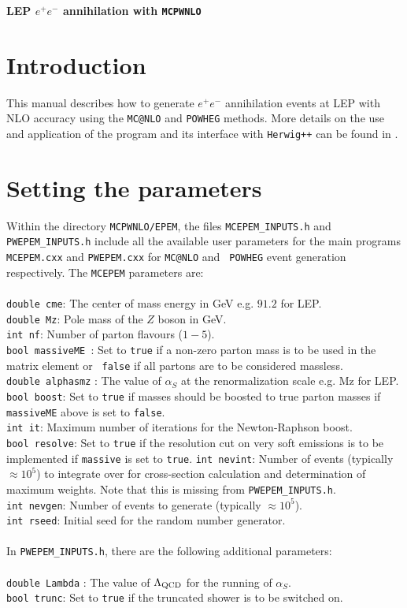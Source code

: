\documentclass[12pt,a4paper,oneside]{article}
\begin{document}
\begin{center}
\Large \textbf {LEP $e^+e^-$ annihilation with {\tt MCPWNLO}} \\
\end{center}
\section{Introduction}
This manual describes how to generate $e^+e^-$ annihilation events at LEP with NLO accuracy using the {\tt MC@NLO} \cite{Frixione:2002ik} and {\tt POWHEG} \cite{Nason:2004rx} methods. More details on the use and application of the program and its interface with {\tt Herwig++} \cite{Bahr:2008pv} can be found in \cite{LatundeDada:2007jg,LatundeDada:2006gx}.
\section{Setting the parameters}
Within the directory {\tt MCPWNLO/EPEM}, the files {\tt MCEPEM\_INPUTS.h} and {\tt PWEPEM\_INPUTS.h} include all the available user parameters
for the main programs {\tt MCEPEM.cxx} and {\tt PWEPEM.cxx} for {\tt MC@NLO} and {\tt
  POWHEG} event generation respectively. The {\tt MCEPEM} parameters are:\\
\\
{\tt double cme}: The center of mass energy in GeV e.g. $91.2$ for LEP.\\
{\tt double Mz}: Pole mass of the $Z$ boson in GeV.\\
{\tt int nf}: Number of parton flavours ($1-5$).\\
{\tt bool massiveME }: Set to {\tt true} if a non-zero parton mass is to be used in the matrix element or {\tt
  false} if all partons are to be considered massless.\\
{\tt double alphasmz} : The value of $\alpha_S$ at the renormalization scale e.g. Mz for
LEP. \\
{\tt bool boost}: Set to {\tt true} if masses should be boosted to true parton masses if
{\tt massiveME} above is set to {\tt false}.\\
{\tt int it}: Maximum number of iterations for the Newton-Raphson boost.\\
{\tt bool resolve}: Set to {\tt true} if the resolution cut on very soft emissions is to be implemented if {\tt massive}
is set to {\tt true}.
{\tt int nevint}: Number of events (typically $\approx 10^5$) to integrate over for cross-section calculation and
determination of maximum weights. Note that this is missing from {\tt PWEPEM\_INPUTS.h}. \\
{\tt int nevgen}: Number of events to generate (typically $ \approx 10^5$). \\
{\tt int rseed}:  Initial seed for the random number generator. \\ 
\\
In {\tt PWEPEM\_INPUTS.h}, there are the following additional parameters:\\
\\
{\tt double Lambda} : The value of $\Lambda_{\rm QCD}$ for the running of $\alpha_S$. \\
{\tt bool trunc}: Set to {\tt true} if the truncated shower is to be switched on.
\end{document}
